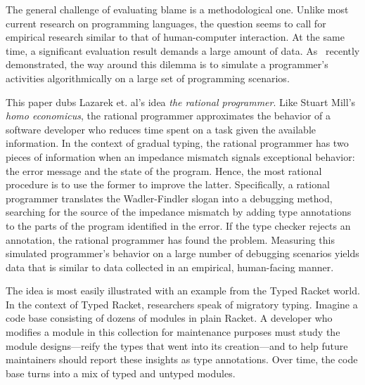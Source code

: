 
The general challenge of evaluating blame is a methodological one. Unlike most
current research on programming languages, the question seems to call for
empirical research similar to that of human-computer interaction. At the same
time, a significant evaluation result demands a large amount of
data. As~\citet{lksfd-popl-2020} recently demonstrated, the way around this
dilemma is to simulate a programmer's activities algorithmically on a large set
of programming scenarios.



This paper dubs Lazarek et. al's idea {\em the rational programmer\/}. Like Stuart
Mill's {\it homo economicus\/}, the rational programmer approximates the
behavior of a software developer who reduces time spent on a task given the
available information. In the context of gradual typing, the rational programmer
has two pieces of information when an impedance mismatch signals exceptional
behavior: the error message and the state of the program. Hence, the most
rational procedure is to use the former to improve the latter. Specifically,
a rational programmer translates the Wadler-Findler slogan into a debugging
method, searching for the source of the impedance mismatch by adding type
annotations to the parts of the program identified in the error.
If the type checker rejects an annotation, the rational programmer has found the problem.
Measuring this simulated programmer's behavior on a large number of
debugging scenarios yields data that is similar to data collected in an
empirical, human-facing manner.

The idea is most easily illustrated with an example from the Typed Racket
world. In the context of Typed Racket, researchers speak of migratory
typing. Imagine a code base consisting of dozens of modules in plain Racket.  A
developer who modifies a module in this collection for maintenance purposes must
study the module designs---reify the types that went into its creation---and to
help future maintainers should report these insights as type annotations. Over
time, the code base turns into a mix of typed and untyped modules.

